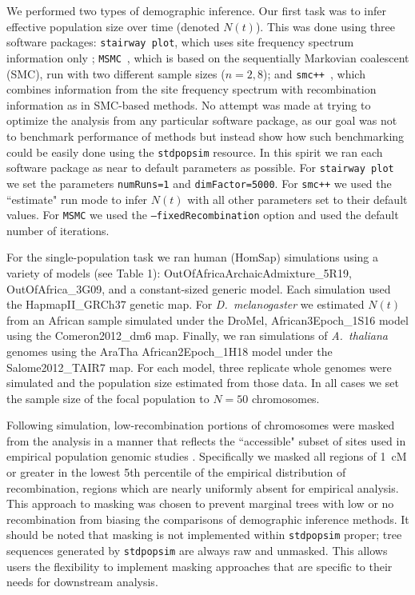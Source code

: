 \documentclass[12pt,halfline,a4paper]{ouparticle}
\newcommand{\stdpopsim}{\texttt{stdpopsim}\xspace}
\newcommand{\MSMC}{\texttt{MSMC}\xspace}
\newcommand{\smcpp}{\texttt{smc++}\xspace}
\newcommand{\stairwayplot}{\texttt{stairway plot}\xspace}
\begin{document}
We performed two types of demographic inference.
Our first task was to infer effective population size over time (denoted $N(t)$).
This was done using three software packages: \stairwayplot,
which uses site frequency spectrum information only \citep{liu2015exploring};
\MSMC~\citep{schiffels2014inferring},
which is based on the sequentially Markovian coalescent (SMC),
run with two different sample sizes ($n = 2 , 8$);
and \smcpp~\citep{terhorst2017robust},
which combines information from the site frequency spectrum with
recombination information as in SMC-based methods. No attempt
was made at trying to optimize the analysis from
any particular software package,
as our goal was not to benchmark performance of methods but
instead show how such benchmarking could be easily done using
the \stdpopsim resource. In this spirit we ran each software package as near
to default parameters as possible. For \stairwayplot we
set the parameters \texttt{numRuns=1} and \texttt{dimFactor=5000}.
For \smcpp we used the ``estimate" run mode to infer $N(t)$ with all other parameters set
to their default values. For \MSMC we used the \texttt{--fixedRecombination}
option and used the default number of iterations.

For the single-population task we ran human (HomSap) simulations
using a variety of models (see Table 1): OutOfAfricaArchaicAdmixture\_5R19, OutOfAfrica\_3G09,
and a constant-sized generic model.
Each simulation
used the HapmapII\_GRCh37 genetic map. For \textit{D.~melanogaster}
we estimated $N(t)$ from an African sample simulated under the DroMel,
African3Epoch\_1S16 model using the Comeron2012\_dm6 map.
Finally, we ran simulations of \textit{A.~thaliana} genomes using the
AraTha African2Epoch\_1H18 model under the Salome2012\_TAIR7 map.
For each model, three replicate whole genomes were
simulated and the population size estimated from those data. In all cases we
set the sample size of the focal population to $N=50$ chromosomes.

Following simulation, low-recombination portions of chromosomes were masked
from the analysis in a manner that reflects the ``accessible" subset of sites
used in empirical population genomic studies \citep[e.g.,][]{danecek20111000,langley2012genomic}.
Specifically we masked all regions of \SI{1}{cM} or greater in the lowest 5th percentile of the empirical
distribution of recombination, regions which are nearly uniformly absent for empirical analysis.
This approach to masking was chosen to prevent marginal trees with low or no recombination
from biasing the comparisons of demographic inference methods. It should be noted that masking is not implemented
within \texttt{stdpopsim} proper; tree sequences generated by \texttt{stdpopsim} are always raw and unmasked.
This allows users the flexibility to implement masking approaches that are specific to their needs
for downstream analysis.
\end{document}
